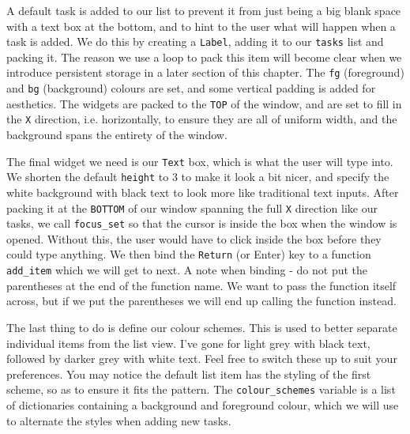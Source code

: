 \documentclass[a4paper,11pt,openany]{book}
\begin{document}
\vspace{5mm}

A default task is added to our list to prevent it from just being a big blank space with a text box at the bottom, and to hint to the user what will happen when a task is added. We do this by creating a \lstinline[columns=fixed]{Label}, adding it to our \lstinline[columns=fixed]{tasks} list and packing it. The reason we use a loop to pack this item will become clear when we introduce persistent storage in a later section of this chapter. The \lstinline[columns=fixed]{fg} (foreground) and \lstinline[columns=fixed]{bg} (background) colours are set, and some vertical padding is added for aesthetics. The widgets are packed to the \lstinline[columns=fixed]{TOP} of the window, and are set to fill in the \lstinline[columns=fixed]{X} direction, i.e. horizontally, to ensure they are all of uniform width, and the background spans the entirety of the window. 

\vspace{5mm}

The final widget we need is our \lstinline[columns=fixed]{Text} box, which is what the user will type into. We shorten the default \lstinline[columns=fixed]{height} to 3 to make it look a bit nicer, and specify the white background with black text to look more like traditional text inputs. After packing it at the \lstinline[columns=fixed]{BOTTOM} of our window spanning the full \lstinline[columns=fixed]{X} direction like our tasks, we call \lstinline[columns=fixed]{focus_set} so that the cursor is inside the box when the window is opened. Without this, the user would have to click inside the box before they could type anything. We then bind the \lstinline[columns=fixed]{Return} (or Enter) key to a function \lstinline[columns=fixed]{add_item} which we will get to next. A note when binding - do not put the parentheses at the end of the function name. We want to pass the function itself across, but if we put the parentheses we will end up calling the function instead. 

\vspace{5mm}

The last thing to do is define our colour schemes. This is used to better separate individual items from the list view. I've gone for light grey with black text, followed by darker grey with white text. Feel free to switch these up to suit your preferences. You may notice the default list item has the styling of the first scheme, so as to ensure it fits the pattern. The \lstinline[columns=fixed]{colour_schemes} variable is a list of dictionaries containing a background and foreground colour, which we will use to alternate the styles when adding new tasks.  
\end{document}
